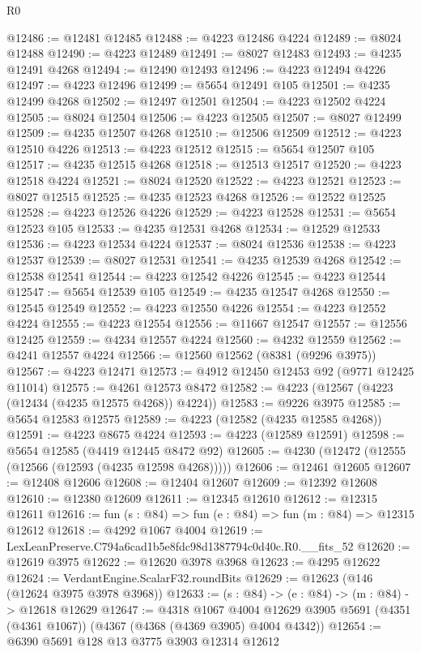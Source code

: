 \begin{lexlean}{R0}
\begin{coremodule}
@12486 := @12481 @12485
@12488 := @4223 @12486 @4224
@12489 := @8024 @12488
@12490 := @4223 @12489
@12491 := @8027 @12483
@12493 := @4235 @12491 @4268
@12494 := @12490 @12493
@12496 := @4223 @12494 @4226
@12497 := @4223 @12496
@12499 := @5654 @12491 @105
@12501 := @4235 @12499 @4268
@12502 := @12497 @12501
@12504 := @4223 @12502 @4224
@12505 := @8024 @12504
@12506 := @4223 @12505
@12507 := @8027 @12499
@12509 := @4235 @12507 @4268
@12510 := @12506 @12509
@12512 := @4223 @12510 @4226
@12513 := @4223 @12512
@12515 := @5654 @12507 @105
@12517 := @4235 @12515 @4268
@12518 := @12513 @12517
@12520 := @4223 @12518 @4224
@12521 := @8024 @12520
@12522 := @4223 @12521
@12523 := @8027 @12515
@12525 := @4235 @12523 @4268
@12526 := @12522 @12525
@12528 := @4223 @12526 @4226
@12529 := @4223 @12528
@12531 := @5654 @12523 @105
@12533 := @4235 @12531 @4268
@12534 := @12529 @12533
@12536 := @4223 @12534 @4224
@12537 := @8024 @12536
@12538 := @4223 @12537
@12539 := @8027 @12531
@12541 := @4235 @12539 @4268
@12542 := @12538 @12541
@12544 := @4223 @12542 @4226
@12545 := @4223 @12544
@12547 := @5654 @12539 @105
@12549 := @4235 @12547 @4268
@12550 := @12545 @12549
@12552 := @4223 @12550 @4226
@12554 := @4223 @12552 @4224
@12555 := @4223 @12554
@12556 := @11667 @12547
@12557 := @12556 @12425
@12559 := @4234 @12557 @4224
@12560 := @4232 @12559
@12562 := @4241 @12557 @4224
@12566 := @12560 @12562 (@8381 (@9296 @3975))
@12567 := @4223 @12471
@12573 := @4912 @12450 @12453 @92 (@9771 @12425 @11014)
@12575 := @4261 @12573 @8472
@12582 := @4223 (@12567 (@4223 (@12434 (@4235 @12575 @4268)) @4224))
@12583 := @9226 @3975
@12585 := @5654 @12583 @12575
@12589 := @4223 (@12582 (@4235 @12585 @4268))
@12591 := @4223 @8675 @4224
@12593 := @4223 (@12589 @12591)
@12598 := @5654 @12585 (@4419 @12445 @8472 @92)
@12605 := @4230 (@12472 (@12555 (@12566 (@12593 (@4235 @12598 @4268)))))
@12606 := @12461 @12605
@12607 := @12408 @12606
@12608 := @12404 @12607
@12609 := @12392 @12608
@12610 := @12380 @12609
@12611 := @12345 @12610
@12612 := @12315 @12611
@12616 := fun (s : @84) => fun (e : @84) => fun (m : @84) => @12315 @12612
@12618 := @4292 @1067 @4004
@12619 := LexLeanPreserve.C794a6cad1b5e8fdc98d1387794c0d40c.R0.__fits_52
@12620 := @12619 @3975
@12622 := @12620 @3978 @3968
@12623 := @4295 @12622
@12624 := VerdantEngine.ScalarF32.roundBits
@12629 := @12623 (@146 (@12624 @3975 @3978 @3968))
@12633 := (s : @84) -> (e : @84) -> (m : @84) -> @12618 @12629
@12647 := @4318
    @1067
    @4004
    @12629
    @3905
    @5691
    (@4351 (@4361 @1067))
    (@4367 (@4368 (@4369 @3905) @4004 @4342))
@12654 := @6390 @5691 @128 @13 @3775 @3903 @12314 @12612

\end{coremodule}
\end{lexlean}
